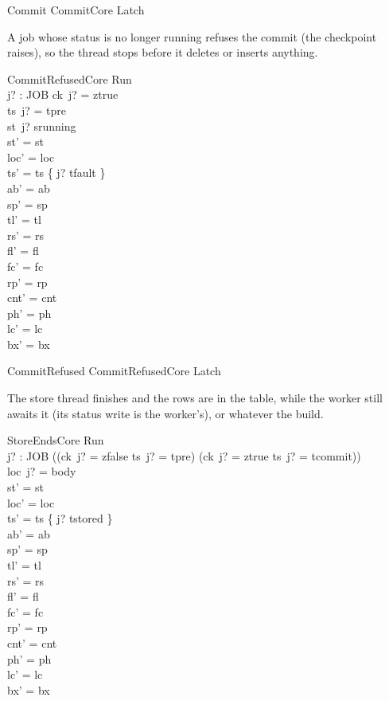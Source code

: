 \documentclass[a4paper,10pt,fleqn]{article}
\begin{document}
\begin{zed}
Commit  CommitCore \land Latch
\end{zed}

A job whose status is no longer running refuses the commit (the checkpoint
raises), so the thread stops before it deletes or inserts anything.

\begin{schema}{CommitRefusedCore}
\Delta Run \\ j? : JOB
\where
ck~j? = ztrue \\
ts~j? = tpre \\
st~j? \neq srunning \\
st' = st \\
loc' = loc \\
ts' = ts \oplus \{ j? \mapsto tfault \} \\
ab' = ab \\
sp' = sp \\
tl' = tl \\
rs' = rs \\
fl' = fl \\
fc' = fc \\
rp' = rp \\
cnt' = cnt \\
ph' = ph \\
lc' = lc \\
bx' = bx
\end{schema}

\begin{zed}
CommitRefused  CommitRefusedCore \land Latch
\end{zed}

The store thread finishes and the rows are in the table, while the worker still
awaits it (its status write is the worker's), or whatever the build.

\begin{schema}{StoreEndsCore}
\Delta Run \\ j? : JOB
\where
((ck~j? = zfalse \land ts~j? = tpre) \lor (ck~j? = ztrue \land ts~j? = tcommit)) \\
loc~j? = body \\
st' = st \\
loc' = loc \\
ts' = ts \oplus \{ j? \mapsto tstored \} \\
ab' = ab \\
sp' = sp \\
tl' = tl \\
rs' = rs \\
fl' = fl \\
fc' = fc \\
rp' = rp \\
cnt' = cnt \\
ph' = ph \\
lc' = lc \\
bx' = bx
\end{schema}
\end{document}
